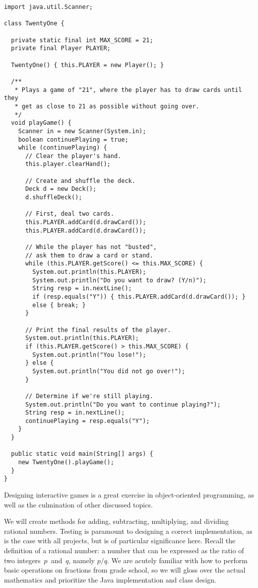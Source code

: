 \begin{lstlisting}[language=MyJava]
import java.util.Scanner;

class TwentyOne {

  private static final int MAX_SCORE = 21;
  private final Player PLAYER;

  TwentyOne() { this.PLAYER = new Player(); }

  /**
   * Plays a game of "21", where the player has to draw cards until they
   * get as close to 21 as possible without going over.
   */
  void playGame() {
    Scanner in = new Scanner(System.in);
    boolean continuePlaying = true;
    while (continuePlaying) {
      // Clear the player's hand.
      this.player.clearHand();

      // Create and shuffle the deck.
      Deck d = new Deck();
      d.shuffleDeck();

      // First, deal two cards.
      this.PLAYER.addCard(d.drawCard());
      this.PLAYER.addCard(d.drawCard());

      // While the player has not "busted", 
      // ask them to draw a card or stand.
      while (this.PLAYER.getScore() <= this.MAX_SCORE) {
        System.out.println(this.PLAYER);
        System.out.println("Do you want to draw? (Y/n)");
        String resp = in.nextLine();
        if (resp.equals("Y")) { this.PLAYER.addCard(d.drawCard()); }
        else { break; }
      }

      // Print the final results of the player.
      System.out.println(this.PLAYER);
      if (this.PLAYER.getScore() > this.MAX_SCORE) {
        System.out.println("You lose!");
      } else {
        System.out.println("You did not go over!");
      }

      // Determine if we're still playing.
      System.out.println("Do you want to continue playing?");
      String resp = in.nextLine();
      continuePlaying = resp.equals("Y");
    }
  }

  public static void main(String[] args) {
    new TwentyOne().playGame();
  }
}
\end{lstlisting}

Designing interactive games is a great exercise in object-oriented programming, as well as the culmination of other discussed topics.

We will create methods for adding, subtracting, multiplying, and dividing rational numbers. 
Testing is paramount to designing a correct implementation, as is the case with all projects, but is of particular significance here. 
Recall the definition of a rational number: a number that can be expressed as the ratio of two integers~$p$~and~$q$, namely $p/q$. 
We are acutely familiar with how to perform basic operations on fractions from grade school, so we will gloss over the actual mathematics and prioritize the Java implementation and class design.


